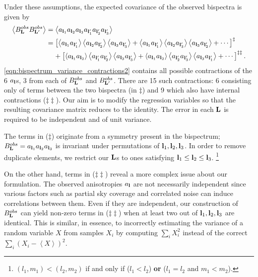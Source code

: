Under these assumptions, the expected covariance of the observed bispectra is given by
\begin{align}
	\left< B^{obs}_\mathbf{L} B^{obs}_{\mathbf{L}'} \right> &= \left< a_{\mathbf{l}_1} a_{\mathbf{l}_2} a_{\mathbf{l}_3} a_{\mathbf{l}'_1} a_{\mathbf{l}'_2} a_{\mathbf{l}'_3} \right> 
	\label{eqn:bispectrum_variance_contractions1} \\
	&= \left[ \left< a_{\mathbf{l}_1} a_{\mathbf{l}'_1} \right> \left< a_{\mathbf{l}_2} a_{\mathbf{l}'_2} \right> \left< a_{\mathbf{l}_3} a_{\mathbf{l}'_3} \right> + \left< a_{\mathbf{l}_1} a_{\mathbf{l}'_1} \right> \left< a_{\mathbf{l}_2} a_{\mathbf{l}'_3} \right> \left< a_{\mathbf{l}_3} a_{\mathbf{l}'_2} \right> + \cdots \right]^\ddagger \nonumber \\
	&\;\;\;\; + \left[ \left< a_{\mathbf{l}_1} a_{\mathbf{l}_2} \right> \left< a_{\mathbf{l}'_1} a_{\mathbf{l}'_2} \right> \left< a_{\mathbf{l}_3} a_{\mathbf{l}'_3} \right> + \left< a_{\mathbf{l}_1} a_{\mathbf{l}_2} \right> \left< a_{\mathbf{l}'_2} a_{\mathbf{l}'_3} \right> \left< a_{\mathbf{l}_3} a_{\mathbf{l}'_1} \right> + \cdots \right]^{\ddagger\ddagger} \label{eqn:bispectrum_variance_contractions2}.
\end{align}
\eqref{eqn:bispectrum_variance_contractions2} contains all possible contractions of the 6 $a_\mathbf{l}$s, 3 from each of $B^{obs}_\mathbf{L}$ and $B^{obs}_{\mathbf{L}'}$. There are 15 such contractions: 6 consisting only of terms between the two bispectra (in $\ddagger$) and 9 which also have internal contractions ($\ddagger\ddagger$). Our aim is to modify the regression variables so that the resulting covariance matrix reduces to the identity. The error in each $\mathbf{L}$ is required to be independent and of unit variance.

The terms in ($\ddagger$) originate from a symmetry present in the bispectrum; $B^{obs}_\mathbf{L} = a_{\mathbf{l}_1}  a_{\mathbf{l}_2}  a_{\mathbf{l}_3}$ is invariant under permutations of ${\mathbf{l}_1, \mathbf{l}_2, \mathbf{l}_3}$. In order to remove duplicate elements, we restrict our $\mathbf{L}$s to ones satisfying $\mathbf{l}_1 \le \mathbf{l}_2 \le \mathbf{l}_3$. \footnote{$(l_1,m_1) < (l_2,m_2)$ if and only if ($l_1 < l_2$) \textbf{or} ($l_1 = l_2$ and $m_1 < m_2$).}

On the other hand, terms in ($\ddagger\ddagger$) reveal a more complex issue about our formulation. The observed anisotropies $a_\mathbf{l}$ are not necessarily independent since various factors such as partial sky coverage and correlated noise can induce correlations between them. Even if they are independent, our construction of $B^{obs}_\mathbf{L}$ can yield non-zero terms in ($\ddagger\ddagger$) when at least two out of $\mathbf{l}_1, \mathbf{l}_2, \mathbf{l}_3$ are identical. This is similar, in essence, to incorrectly estimating the variance of a random variable $X$ from samples $X_i$ by computing $\sum_i X_i^2$ instead of the correct $\sum_i (X_i- \left< X \right>)^2$.


